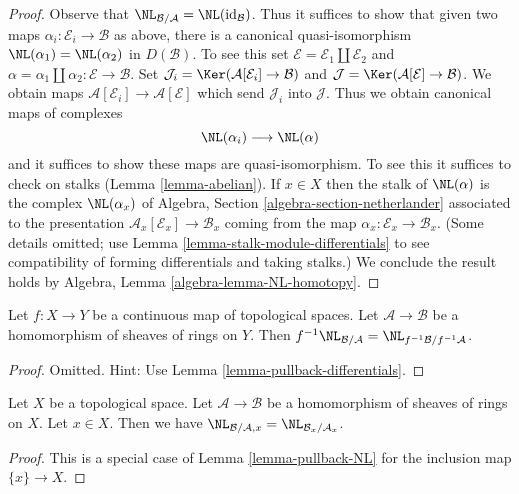 \begin{proof}
Observe that $\NL_{\mathcal{B}/\mathcal{A}} = \NL(\text{id}_\mathcal{B})$.
Thus it suffices to show that given two maps
$\alpha_i : \mathcal{E}_i \to \mathcal{B}$ as above, there is a
canonical quasi-isomorphism $\NL(\alpha_1) = \NL(\alpha_2)$ in $D(\mathcal{B})$.
To see this set $\mathcal{E} = \mathcal{E}_1 \amalg \mathcal{E}_2$ and
$\alpha = \alpha_1 \amalg \alpha_2 : \mathcal{E} \to \mathcal{B}$.
Set
$\mathcal{J}_i = \Ker(\mathcal{A}[\mathcal{E}_i] \to \mathcal{B})$
and
$\mathcal{J} = \Ker(\mathcal{A}[\mathcal{E}] \to \mathcal{B})$.
We obtain maps $\mathcal{A}[\mathcal{E}_i] \to \mathcal{A}[\mathcal{E}]$
which send $\mathcal{J}_i$ into $\mathcal{J}$.
Thus we obtain canonical maps of complexes
$$
\NL(\alpha_i) \longrightarrow \NL(\alpha)
$$
and it suffices to show these maps are quasi-isomorphism. To see this
it suffices to check on stalks (Lemma \ref{lemma-abelian}). If $x \in X$
then the stalk of $\NL(\alpha)$ is the complex $\NL(\alpha_x)$ of
Algebra, Section \ref{algebra-section-netherlander}
associated to the presentation $\mathcal{A}_x[\mathcal{E}_x] \to \mathcal{B}_x$
coming from the map $\alpha_x : \mathcal{E}_x \to \mathcal{B}_x$.
(Some details omitted; use Lemma \ref{lemma-stalk-module-differentials}
to see compatibility of forming differentials and taking stalks.)
We conclude the result holds by
Algebra, Lemma \ref{algebra-lemma-NL-homotopy}.
\end{proof}

\begin{lemma}
\label{lemma-pullback-NL}
Let $f : X \to Y$ be a continuous map of topological spaces.
Let $\mathcal{A} \to \mathcal{B}$ be a homomorphism of sheaves of rings
on $Y$. Then $f^{-1}\NL_{\mathcal{B}/\mathcal{A}} =
\NL_{f^{-1}\mathcal{B}/f^{-1}\mathcal{A}}$.
\end{lemma}

\begin{proof}
Omitted. Hint: Use Lemma \ref{lemma-pullback-differentials}.
\end{proof}

\begin{lemma}
\label{lemma-stalk-NL}
Let $X$ be a topological space. Let $\mathcal{A} \to \mathcal{B}$
be a homomorphism of sheaves of rings on $X$. Let $x \in X$.
Then we have $\NL_{\mathcal{B}/\mathcal{A}, x} =
\NL_{\mathcal{B}_x/\mathcal{A}_x}$.
\end{lemma}

\begin{proof}
This is a special case of Lemma \ref{lemma-pullback-NL}
for the inclusion map $\{x\} \to X$.
\end{proof}

